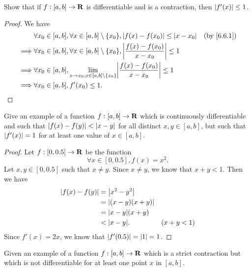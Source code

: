 \begin{exercise}\label{ex 6.6.2}
  Show that if \(f : [a, b] \to \mathbf{R}\) is differentiable and is a contraction, then \(\left\lvert f'(x)\right\rvert \leq 1\).
\end{exercise}

\begin{proof}
  We have
  \begin{align*}
             & \forall x_0 \in [a, b], \forall x \in [a, b] \setminus \{x_0\}, \abs{f(x) - f(x_0)} \leq \abs{x - x_0}               & \text{(by \cref{6.6.1})} \\
    \implies & \forall x_0 \in [a, b], \forall x \in [a, b] \setminus \{x_0\}, \abs{\frac{f(x) - f(x_0)}{x - x_0}} \leq 1                                      \\
    \implies & \forall x_0 \in [a, b], \lim_{x \to x_0 ; x \in [a, b] \setminus \{x_0\}} \abs{\frac{f(x) - f(x_0)}{x - x_0}} \leq 1                            \\
    \implies & \forall x_0 \in [a, b], f'(x_0) \leq 1.
  \end{align*}
\end{proof}

\begin{exercise}\label{ex 6.6.3}
  Give an example of a function \(f : [a, b] \to \mathbf{R}\) which is continuously differentiable and such that \(\left\lvert f(x) - f(y)\right\rvert < \left\lvert x - y\right\rvert\) for all distinct \(x, y \in [a, b]\), but such that \(\left\lvert f'(x)\right\rvert = 1\) for at least one value of \(x \in [a, b]\).
\end{exercise}

\begin{proof}
  Let \(f : [0, 0.5] \to \mathbf{R}\) be the function
  \[
    \forall x \in [0, 0.5], f(x) = x^2.
  \]
  Let \(x, y \in [0, 0.5]\) such that \(x \neq y\).
  Since \(x \neq y\), we know that \(x + y < 1\).
  Then we have
  \begin{align*}
    \abs{f(x) - f(y)} & = \abs{x^2 - y^2}                    \\
                      & = \abs{(x - y)(x + y)}               \\
                      & = \abs{x - y} (x + y)                \\
                      & < \abs{x - y}.         & (x + y < 1)
  \end{align*}
  Since \(f'(x) = 2x\), we know that \(\left\lvert f'(0.5)\right\rvert = \left\lvert1\right\rvert = 1\).
\end{proof}

\begin{exercise}\label{ex 6.6.4}
  Given an example of a function \(f : [a, b] \to \mathbf{R}\) which is a strict contraction but which is not differentiable for at least one point \(x\) in \([a, b]\).
\end{exercise}

